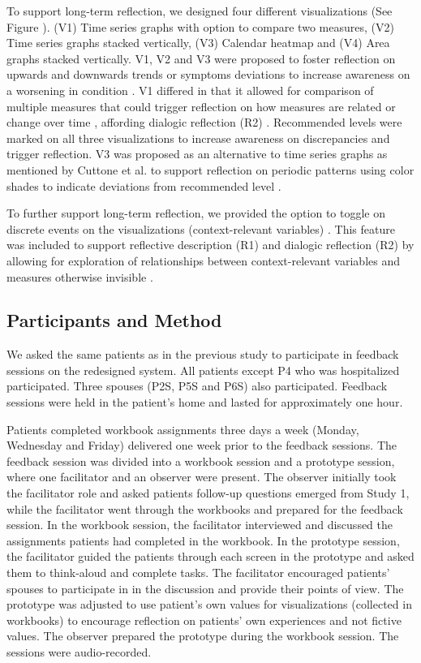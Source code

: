 To support long-term reflection, we designed four different visualizations (See Figure ). (V1) Time series graphs with option to compare two measures, (V2) Time series graphs stacked vertically, (V3) Calendar heatmap and (V4) Area graphs stacked vertically. V1, V2 and V3 were proposed to foster reflection on upwards and downwards trends or symptoms deviations to increase awareness on a worsening in condition \cite{Rivera}. V1 differed in that it allowed for comparison of multiple measures that could trigger reflection on how measures are related or change over time \cite{Cuttone}, affording dialogic reflection (R2) \cite{Fleck}. Recommended levels were marked on all three visualizations to increase awareness on discrepancies \cite{Li2010} and trigger reflection. V3 was proposed as an alternative to time series graphs as mentioned by Cuttone et al. to support reflection on periodic patterns using color shades to indicate deviations from recommended level \cite{Cuttone, Li2010}.   

To further support long-term reflection, we provided the option to toggle on discrete events on the visualizations (context-relevant variables) \cite{Sorensen}. This feature was included to support reflective description (R1) and dialogic reflection (R2) by allowing for exploration of relationships between context-relevant variables and measures otherwise invisible \cite{Fleck}.   

\subsection{Participants and Method}
We asked the same patients as in the previous study to participate in feedback sessions on the redesigned system. All patients except P4 who was hospitalized participated. Three spouses (P2S, P5S and P6S) also participated. Feedback sessions were held in the patient’s home and lasted for approximately one hour. 

Patients completed workbook assignments three days a week (Monday, Wednesday and Friday) delivered one week prior to the feedback sessions. The feedback session was divided into a workbook session and a prototype session, where one facilitator and an observer were present. The observer initially took the facilitator role and asked patients follow-up questions emerged from Study 1, while the facilitator went through the workbooks and prepared for the feedback session. In the workbook session, the facilitator interviewed and discussed the assignments patients had completed in the workbook. In the prototype session, the facilitator guided the patients through each screen in the prototype and asked them to think-aloud and complete tasks. The facilitator encouraged patients’ spouses to participate in in the discussion and provide their points of view. The prototype was adjusted to use patient’s own values for visualizations (collected in workbooks) to encourage reflection on patients’ own experiences and not fictive values. The observer prepared the prototype during the workbook session. The sessions were audio-recorded. 

